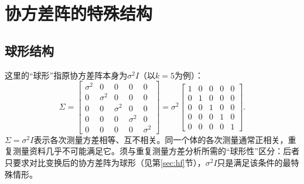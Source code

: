 \section{协方差阵的特殊结构}\label{sec:sph}
\subsection{球形结构}
这里的“球形”指原协方差阵本身为$\sigma^2I$（以$k=5$为例）：
\[
\Sigma=\begin{bmatrix}
\sigma^2&0&0&0&0\\0&\sigma^2&0&0&0\\0&0&\sigma^2&0&0\\
0&0&0&\sigma^2&0\\0&0&0&0&\sigma^2
\end{bmatrix}
=\sigma^2\begin{bmatrix}
1&0&0&0&0\\0&1&0&0&0\\0&0&1&0&0\\0&0&0&1&0\\0&0&0&0&1
\end{bmatrix}.
\]
$\Sigma=\sigma^2I$表示各次测量方差相等、互不相关。同一个体的各次测量通常正相关，重复测量资料几乎不可能满足它。须与重复测量方差分析所需的“球形性”区分：后者只要求对比变换后的协方差阵为球形（见第\ref{sec:hf}节），$\sigma^2I$只是满足该条件的最特殊情形。
